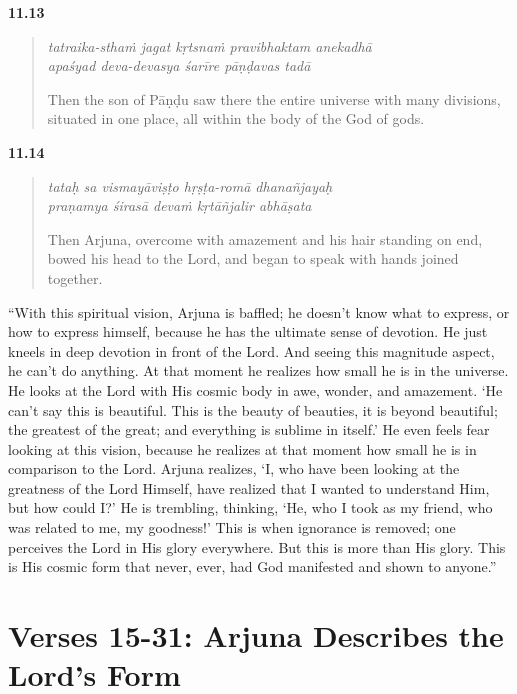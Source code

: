 \par\noindent\textbf{11.13}\par
\begin{verse}
\textit{tatraika-sthaṁ jagat kṛtsnaṁ pravibhaktam anekadhā} \\
\textit{apaśyad deva-devasya śarīre pāṇḍavas tadā}

\noindent Then the son of Pāṇḍu saw there the entire universe with many divisions, situated in one place, all within the body of the God of gods.
\end{verse}
\par



\par\noindent\textbf{11.14}\par
\begin{verse}
\textit{tataḥ sa vismayāviṣṭo hṛṣṭa-romā dhanañjayaḥ} \\
\textit{praṇamya śirasā devaṁ kṛtāñjalir abhāṣata}

\noindent Then Arjuna, overcome with amazement and his hair standing on end, bowed his head to the Lord, and began to speak with hands joined together.
\end{verse}
\par


\enquote{With this spiritual vision, Arjuna is baffled; he doesn’t know what to express, or how to express himself, because he has the ultimate sense of devotion. He just kneels in deep devotion in front of the Lord. And seeing this magnitude aspect, he can’t do anything. At that moment he realizes how small he is in the universe. He looks at the Lord with His cosmic body in awe, wonder, and amazement. \enquote{He can’t say this is beautiful. This is the beauty of beauties, it is beyond beautiful; the greatest of the great; and everything is sublime in itself.} He even feels fear looking at this vision, because he realizes at that moment how small he is in comparison to the Lord. Arjuna realizes, \enquote{I, who have been looking at the greatness of the Lord Himself, have realized that I wanted to understand Him, but how could I?} He is trembling, thinking, \enquote{He, who I took as my friend, who was related to me, my goodness!} This is when ignorance is removed; one perceives the Lord in His glory everywhere. But this is more than His glory. This is His cosmic form that never, ever, had God manifested and shown to anyone.}


\section{Verses 15-31: Arjuna Describes the Lord's Form}\label{sec-verses-15-31-arjuna-describes-the-lord-s-form}



